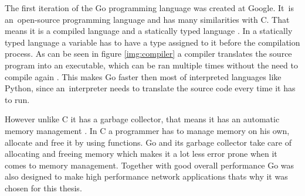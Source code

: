 The first iteration of the Go programming language was created at Google. It~is an~open-source programming language and has many similarities with C. That means it is a compiled language and a statically typed language \cite{Donovan2016}. In a statically typed language a variable has to have a type assigned to it before the compilation process. As can be seen in figure \ref{img:compiler} a compiler translates the source program into an executable, which can be ran multiple times without the need to compile again \cite{Aho2006}. This makes Go faster then most of interpreted languages like Python, since an~interpreter needs to translate the source code every time it has to run.


However unlike C it has a garbage collector, that means it has an automatic memory management \cite{Donovan2016}. In C a programmer has to manage memory on his own, allocate and free it by using functions. Go and its garbage collector take care of allocating and freeing memory which makes it a lot less error prone when it comes to memory management. Together with good overall performance Go was also designed to make high performance network applications thats why it was chosen for this thesis.